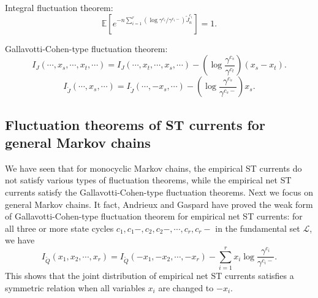 Integral fluctuation theorem: 
\begin{equation*}
	\mathbb{E}\left[e^{-n\sum_{i=1}^r(\log \gamma^{c_i}/\gamma^{c_i-})\tilde{J}^{c_i}_n}\right]=1.
\end{equation*}

Gallavotti-Cohen-type fluctuation theorem:
\begin{equation*}
	I_J(\cdots,x_s,\cdots,x_t,\cdots)=I_J(\cdots,x_t,\cdots,x_s,\cdots)-\left(\log\frac{\gamma^{c_s}}{\gamma^{c_t}}\right)(x_s-x_t).
\end{equation*}
\begin{equation*}
	I_{\tilde{J}}(\cdots,x_s,\cdots) = I_{\tilde{J}}(\cdots,-x_s,\cdots)-\left(\log\frac{\gamma^{c_s}}{\gamma^{c_s-}}\right)x_s.
\end{equation*}

\subsection{Fluctuation theorems of ST currents for general Markov chains}
We have seen that for monocyclic Markov chains, the empirical ST currents do not satisfy various types of fluctuation theorems, while the empirical net ST currents satisfy the Gallavotti-Cohen-type fluctuation theorems. Next we focus on general Markov chains. It fact, Andrieux and Gaspard \cite{andrieux2007fluctuation} have proved the weak form of Gallavotti-Cohen-type fluctuation theorem for empirical net ST currents: for all three or more state cycles $c_1,c_1-,c_2,c_2-,\cdots,c_r,c_r-$ in the fundamental set $\mathcal{L}$, we have
\begin{equation*}
I_{\tilde{Q}}(x_1,x_2,\cdots,x_r)
= I_{\tilde{Q}}(-x_1,-x_2,\cdots,-x_r)
-\sum_{i=1}^rx_i\log\frac{\gamma^{c_i}}{\gamma^{c_i-}}.
\end{equation*}
This shows that the joint distribution of empirical net ST currents satisfies a symmetric relation when all variables $x_i$ are changed to $-x_i$. 

